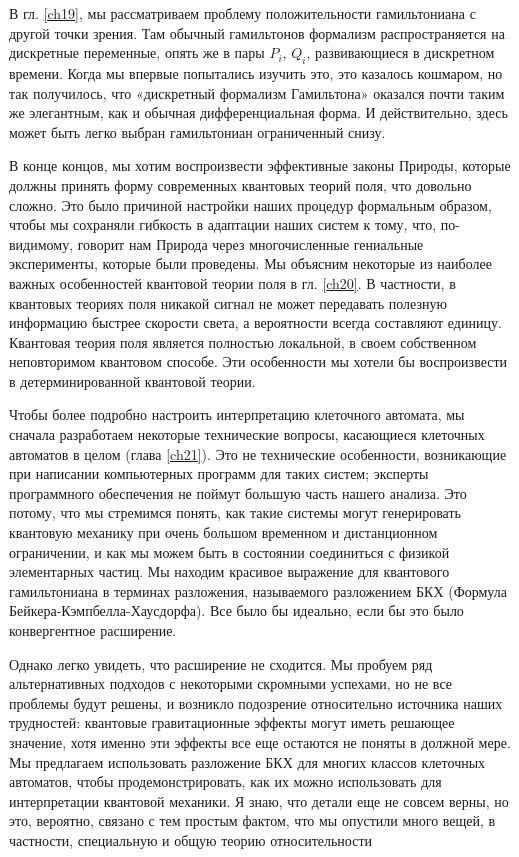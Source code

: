 \documentclass[main.tex]{subfiles}
\begin{document}
В гл. \ref{ch19}, мы рассматриваем проблему положительности гамильтониана с другой точки зрения. Там обычный гамильтонов формализм распространяется на дискретные переменные, опять же в пары $P_i$, $Q_i$, развивающиеся в дискретном времени. Когда мы впервые попытались изучить это, это казалось кошмаром, но так получилось, что «дискретный формализм Гамильтона» оказался почти таким же элегантным, как и обычная дифференциальная форма. И действительно, здесь может быть легко выбран гамильтониан ограниченный снизу.

В конце концов, мы хотим воспроизвести эффективные законы Природы, которые должны принять форму современных квантовых теорий поля, что довольно сложно. Это было причиной настройки наших процедур формальным образом, чтобы мы сохраняли гибкость в адаптации наших систем к тому, что, по-видимому, говорит нам Природа через многочисленные гениальные эксперименты, которые были проведены. Мы объясним некоторые из наиболее важных особенностей квантовой теории поля в гл. \ref{ch20}. В частности, в квантовых теориях поля никакой сигнал не может передавать полезную информацию быстрее скорости света, а вероятности всегда составляют единицу. Квантовая теория поля является полностью локальной, в своем собственном неповторимом квантовом способе. Эти особенности мы хотели бы воспроизвести в детерминированной квантовой теории.

Чтобы более подробно настроить интерпретацию клеточного автомата, мы сначала разработаем некоторые технические вопросы, касающиеся клеточных автоматов в целом (глава \ref{ch21}). Это не технические особенности, возникающие при написании компьютерных программ для таких систем; эксперты программного обеспечения не поймут большую часть нашего анализа. Это потому, что мы стремимся понять, как такие системы могут генерировать квантовую механику при очень большом временном и дистанционном ограничении, и как мы можем быть в состоянии соединиться с физикой элементарных частиц. Мы находим красивое выражение для квантового гамильтониана в терминах разложения, называемого разложением БКХ (Формула Бейкера-Кэмпбелла-Хаусдорфа). Все было бы идеально, если бы это было конвергентное расширение.

Однако легко увидеть, что расширение не сходится. Мы пробуем ряд альтернативных подходов с некоторыми скромными успехами, но не все проблемы будут решены, и возникло подозрение относительно источника наших трудностей: квантовые гравитационные эффекты могут иметь решающее значение, хотя именно эти эффекты все еще остаются не поняты в должной мере. Мы предлагаем использовать разложение БКХ для многих классов клеточных автоматов, чтобы продемонстрировать, как их можно использовать для интерпретации квантовой механики. Я знаю, что детали еще не совсем верны, но это, вероятно, связано с тем простым фактом, что мы опустили много вещей, в частности, специальную и общую теорию относительности
\end{document}
